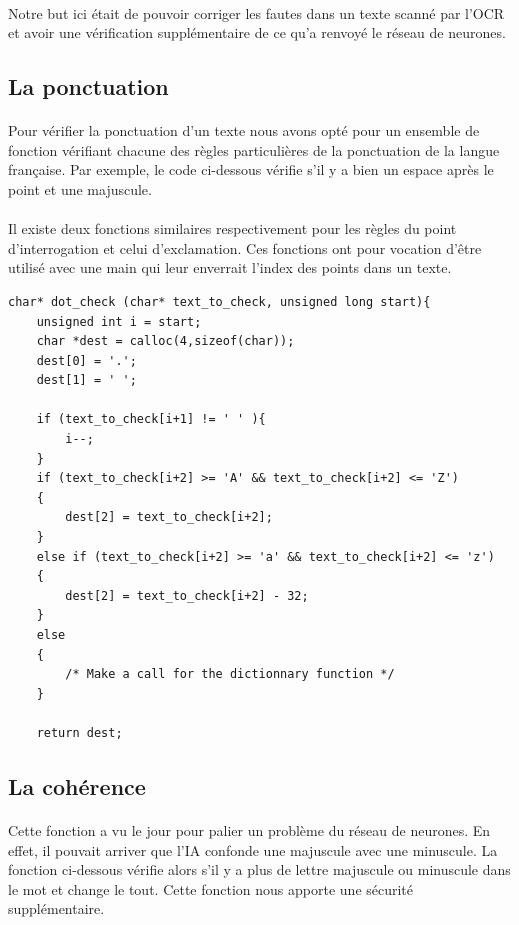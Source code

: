 \documentclass{article}
\begin{document}
\paragraph{}Notre but ici était de pouvoir corriger les fautes dans un texte scanné par l’OCR et avoir une vérification supplémentaire de ce qu’a renvoyé le réseau de neurones.

\subsection{La ponctuation}

\paragraph{}
Pour vérifier la ponctuation d’un texte nous avons opté pour un ensemble de fonction vérifiant chacune des règles particulières de la ponctuation de la langue française. Par exemple, le code ci-dessous vérifie s'il y a bien un espace après le point et une majuscule.

\paragraph{}Il existe deux fonctions similaires respectivement pour les règles du point d’interrogation et celui d’exclamation. Ces fonctions ont pour vocation d'être utilisé avec une main qui leur enverrait l’index des points dans un texte.

\begin{lstlisting}
char* dot_check (char* text_to_check, unsigned long start){
    unsigned int i = start;
    char *dest = calloc(4,sizeof(char));
    dest[0] = '.';
    dest[1] = ' ';

    if (text_to_check[i+1] != ' ' ){
        i--;
    }
    if (text_to_check[i+2] >= 'A' && text_to_check[i+2] <= 'Z')
    {
        dest[2] = text_to_check[i+2];
    }
    else if (text_to_check[i+2] >= 'a' && text_to_check[i+2] <= 'z')
    {
        dest[2] = text_to_check[i+2] - 32;
    }
    else
    {
        /* Make a call for the dictionnary function */
    }

    return dest;
\end{lstlisting}

\subsection{La cohérence}
\paragraph{}Cette fonction a vu le jour pour palier un problème du réseau de neurones. En effet, il pouvait arriver que l'IA confonde une majuscule avec une minuscule. La fonction ci-dessous vérifie alors s’il y a plus de lettre majuscule ou minuscule dans le mot et change le tout.  Cette fonction nous apporte une sécurité supplémentaire.
\end{document}
